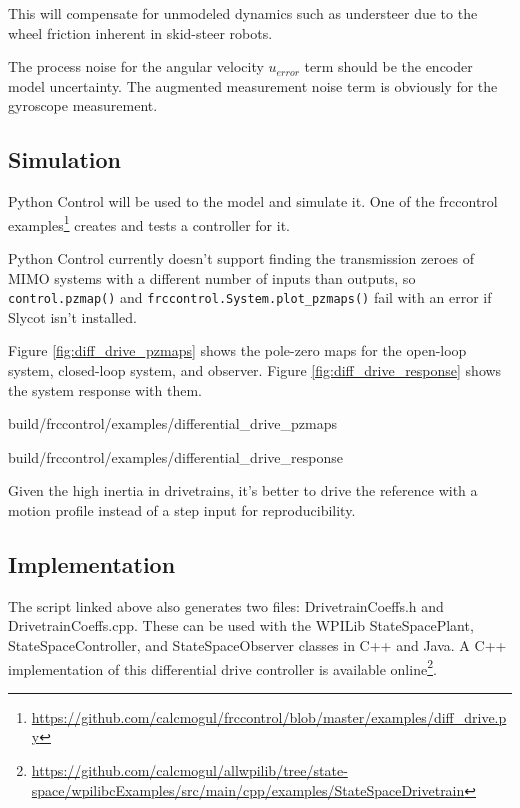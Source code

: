 This will compensate for unmodeled dynamics such as understeer due to the wheel
friction inherent in skid-steer robots.

\begin{remark}
  The process noise for the angular velocity $u_{error}$ term should be the
  encoder \gls{model} uncertainty. The augmented measurement noise term is
  obviously for the gyroscope measurement.
\end{remark}

\subsection{Simulation}

Python Control will be used to  the
\gls{model} and simulate it. One of the frccontrol
examples\footnote{\url{https://github.com/calcmogul/frccontrol/blob/master/examples/diff_drive.py}}
creates and tests a controller for it.

\begin{remark}
  Python Control currently doesn't support finding the transmission zeroes of
  MIMO \glspl{system} with a different number of \glspl{input} than
  \glspl{output}, so \texttt{control.pzmap()} and
  \texttt{frccontrol.System.plot\_pzmaps()} fail with an error if Slycot isn't
  installed.
\end{remark}

Figure \ref{fig:diff_drive_pzmaps} shows the pole-zero maps for the open-loop
\gls{system}, closed-loop \gls{system}, and \gls{observer}. Figure
\ref{fig:diff_drive_response} shows the \gls{system} response with them.

\begin{svg}{build/frccontrol/examples/differential_drive_pzmaps}
  \caption{Drivetrain pole-zero maps}
  \label{fig:diff_drive_pzmaps}
\end{svg}

\begin{svg}{build/frccontrol/examples/differential_drive_response}
  \caption{Drivetrain response}
  \label{fig:diff_drive_response}
\end{svg}

Given the high inertia in drivetrains, it's better to drive the \gls{reference}
with a motion profile instead of a \gls{step input} for reproducibility.

\subsection{Implementation}

The script linked above also generates two files: DrivetrainCoeffs.h and
DrivetrainCoeffs.cpp. These can be used with the WPILib StateSpacePlant,
StateSpaceController, and StateSpaceObserver classes in C++ and Java. A C++
implementation of this differential drive controller is available
online\footnote{
\url{https://github.com/calcmogul/allwpilib/tree/state-space/wpilibcExamples/src/main/cpp/examples/StateSpaceDrivetrain}}.
